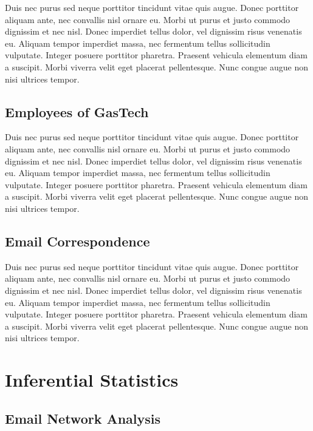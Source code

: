 \documentclass{acm_proc_article-sp}
\begin{document}
Duis nec purus sed neque porttitor tincidunt vitae quis augue. Donec
porttitor aliquam ante, nec convallis nisl ornare eu. Morbi ut purus et
justo commodo dignissim et nec nisl. Donec imperdiet tellus dolor, vel
dignissim risus venenatis eu. Aliquam tempor imperdiet massa, nec
fermentum tellus sollicitudin vulputate. Integer posuere porttitor
pharetra. Praesent vehicula elementum diam a suscipit. Morbi viverra
velit eget placerat pellentesque. Nunc congue augue non nisi ultrices
tempor.

\hypertarget{employees-of-gastech}{%
\subsection{Employees of GasTech}\label{employees-of-gastech}}

Duis nec purus sed neque porttitor tincidunt vitae quis augue. Donec
porttitor aliquam ante, nec convallis nisl ornare eu. Morbi ut purus et
justo commodo dignissim et nec nisl. Donec imperdiet tellus dolor, vel
dignissim risus venenatis eu. Aliquam tempor imperdiet massa, nec
fermentum tellus sollicitudin vulputate. Integer posuere porttitor
pharetra. Praesent vehicula elementum diam a suscipit. Morbi viverra
velit eget placerat pellentesque. Nunc congue augue non nisi ultrices
tempor.

\hypertarget{email-correspondence}{%
\subsection{Email Correspondence}\label{email-correspondence}}

Duis nec purus sed neque porttitor tincidunt vitae quis augue. Donec
porttitor aliquam ante, nec convallis nisl ornare eu. Morbi ut purus et
justo commodo dignissim et nec nisl. Donec imperdiet tellus dolor, vel
dignissim risus venenatis eu. Aliquam tempor imperdiet massa, nec
fermentum tellus sollicitudin vulputate. Integer posuere porttitor
pharetra. Praesent vehicula elementum diam a suscipit. Morbi viverra
velit eget placerat pellentesque. Nunc congue augue non nisi ultrices
tempor.

\hypertarget{inferential-statistics}{%
\section{Inferential Statistics}\label{inferential-statistics}}

\hypertarget{email-network-analysis}{%
\subsection{Email Network Analysis}\label{email-network-analysis}}
\end{document}
